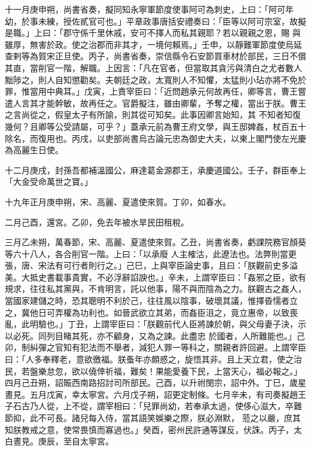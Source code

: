 \begin{pinyinscope}
 十一月庚申朔，尚書省奏，擬同知永寧軍節度使事阿可為刺史，上曰：「阿可年幼，於事未練，授佐貳官可也。」平章政事唐括安禮奏曰：「臣等以阿可宗室，故擬是職。」上曰：「郡守係千里休戚，安可不擇人而私其親耶？若以親親之恩，賜
 與雖厚，無害於政。使之治郡而非其才，一境何賴焉。」壬申，以靜難軍節度使烏延查剌等為賀宋正旦使。丙子，尚書省奏，崇信縣令石安節買車材於部民，三日不償其直，當削官一階，解職。上因言：「凡在官者，但當取其貪污與清白之尤者數人黜陟之，則人自知懲勸矣。夫朝廷之政，太寬則人不知懼，太猛則小玷亦將不免於罪，惟當用中典耳。」戊寅，上責宰臣曰：「近問趙承元何故再任，卿等言，曹王嘗遣人言其才能幹敏，故再任之。官爵擬注，雖由卿輩，予奪之權，當出于朕。曹王之言尚從之，假皇太子有所諭，則其從可知矣。此事因卿言始知，其
 不知者知復幾何？且卿等公受請屬，可乎？」蓋承元前為曹王府文學，與王邸婢姦，杖百五十除名，而復用也。丙戌，以吏部尚書烏古論元忠為御史大夫，以東上閣門使左光慶為高麗生日使。



 十二月庚戌，封孫吾都補溫國公，麻達葛金源郡王，承慶道國公。壬子，群臣奉上「大金受命萬世之寶。」



 十九年正月庚申朔，宋、高麗、夏遣使來賀。丁卯，如春水。



 二月己酉，還宮。乙卯，免去年被水旱民田租稅。



 三月乙未朔，萬春節，宋、高麗、夏遣使來賀。乙丑，尚書省奏，虧課院務官顏葵等六十八人，各合削官一階。上曰：「以承廢
 人主榷沽，此遼法也。法弊則當更張，唐、宋法有可行者則行之。」己巳，上與宰臣論史事，且曰：「朕觀前史多溢美。大抵史書載事貴實，不必浮辭諂諛也。」辛未，上謂宰臣曰：「姦邪之臣，欲有規求，往往私其黨與，不肯明言，託以他事，陽不與而陰為之力。朕觀古之姦人，當國家建儲之時，恐其聰明不利於己，往往風以陰事，破壞其議，惟擇昏懦者立之，冀他日可弄權為功利也。如晉武欲立其弟，而姦臣沮之，竟立惠帝，以致喪亂，此明驗也。」丁丑，上謂宰臣曰：「朕觀前代人臣將諫於朝，與父母妻子決，示以必死。同列目睹其死，亦不顧身，又為之諫。此盡忠
 於國者，人所難能也。」己卯，制糾彈之官知有犯法而不舉者，減犯人罪一等科之，關親者許回避。上謂宰臣曰：「人多奉釋老，意欲徼福。朕蚤年亦頗惑之，旋悟其非。且上天立君，使之治民，若盤樂怠忽，欲以僥倖祈福，難矣！果能愛養下民，上當天心，福必報之。」四月己丑朔，詔賑西南路招討司所部民。己酉，以升祔閔宗，詔中外。丁巳，歲星晝見。五月戊寅，幸太寧宮。六月戊子朔，詔更定制條。七月辛未，有司奏擬趙王子石古乃人從，上不從，謂宰相曰：「兒罪尚幼，若奉承太過，使侈心滋大，卒難節抑，此不可長。諸兒每入侍，當其語笑娛樂之際，朕必淵默，
 蒞之以嚴，庶其知朕教戒之意，使常畏慎而寡過也。」癸酉，密州民許通等謀反，伏誅。丙子，太白晝見。庚辰，至自太寧宮。




\end{pinyinscope}
